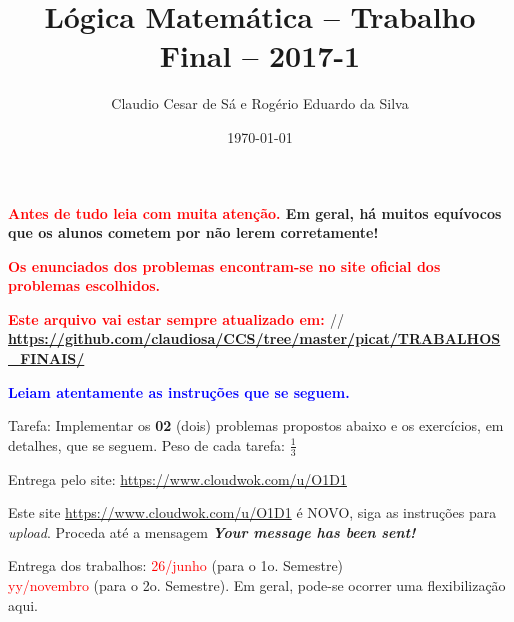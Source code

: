 \documentclass[a4paper,12pt]{article}
\title{Lógica Matemática -- Trabalho Final -- 2017-1}
\author{Claudio Cesar de Sá e Rogério Eduardo da Silva}
\date{\today}
\begin{document}
\maketitle

\begin{flushleft}


\vspace{0.5cm}
  {\bf \textcolor{red}{
Antes de tudo leia com \textbf{muita atenção}.} Em geral, há muitos equívocos
que os alunos cometem por não lerem corretamente!}

\vspace{0.5cm}
  {\bf \textcolor{red}{Os enunciados dos problemas encontram-se no site oficial dos problemas escolhidos.}}


\vspace{0.5cm}
  {\bf \textcolor{red}{Este arquivo vai estar sempre atualizado em: }}//
{\bf \textcolor{red}{\url{https://github.com/claudiosa/CCS/tree/master/picat/TRABALHOS_FINAIS/}}}



\vspace{0.5cm}
 {\bf \textcolor{blue}{Leiam atentamente as
instruções que se seguem.}}


\vspace{0.5cm}
 Tarefa: Implementar os  \textbf{02} (dois)   problemas propostos abaixo e os exercícios, em detalhes, que se seguem. Peso de cada tarefa: $\frac{1}{3}$


\vspace{0.5cm}
 Entrega pelo site: \textcolor{red}{\url{https://www.cloudwok.com/u/O1D1}}


\vspace{0.5cm}
  Este site  \textcolor{red}{\url{https://www.cloudwok.com/u/O1D1}} é NOVO, siga as instruções para \emph{upload}. Proceda até
a mensagem \textbf{ \emph{Your message has been sent!}}

\vspace{0.5cm}
 Entrega dos trabalhos: \textcolor{red}{26/junho} (para o 1o. Semestre)\\
\textcolor{red}{yy/novembro} (para o 2o. Semestre). Em geral, pode-se
ocorrer uma flexibilização aqui.\\




\end{flushleft}
\end{document}
